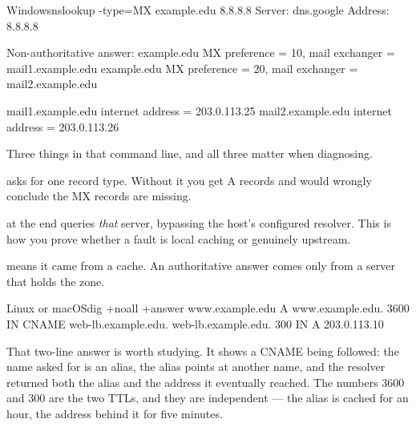 \begin{hostcmd}{Windows}{nslookup -type=MX example.edu 8.8.8.8}
Server:  dns.google
Address:  8.8.8.8

Non-authoritative answer:
example.edu     MX preference = 10, mail exchanger = mail1.example.edu
example.edu     MX preference = 20, mail exchanger = mail2.example.edu

mail1.example.edu       internet address = 203.0.113.25
mail2.example.edu       internet address = 203.0.113.26
\end{hostcmd}

Three things in that command line, and all three matter when diagnosing.

\begin{tight}
  \item {} asks for one record type. Without it you get A records and
        would wrongly conclude the MX records are missing.
  \item {} at the end queries \emph{that} server, bypassing the host's
        configured resolver. This is how you prove whether a fault is local
        caching or genuinely upstream.
  \item {} means it came from a cache. An
        authoritative answer comes only from a server that holds the zone.
\end{tight}

\begin{hostcmd}{Linux or macOS}{dig +noall +answer www.example.edu A}
www.example.edu.      3600    IN    CNAME   web-lb.example.edu.
web-lb.example.edu.   300     IN    A       203.0.113.10
\end{hostcmd}

That two-line answer is worth studying. It shows a CNAME being followed: the name
asked for is an alias, the alias points at another name, and the resolver
returned both the alias and the address it eventually reached. The numbers 3600
and 300 are the two TTLs, and they are independent --- the alias is cached for an
hour, the address behind it for five minutes.

